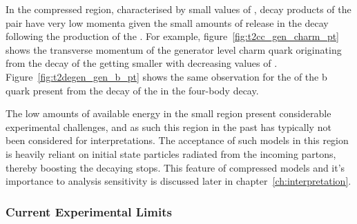 In the compressed region, characterised by small values of \deltam, decay
products of the \sTop pair have very low momenta given the small amounts of
release in the decay following the production of the \chiz. For example, 
figure~\ref{fig:t2cc_gen_charm_pt} shows the transverse momentum of the
generator level charm quark originating from the decay of the \sTop getting
smaller
with decreasing values of \deltam. Figure~\ref{fig:t2degen_gen_b_pt} shows the
same observation for the \Pt of the b quark present from the decay of the
\sTop in the four-body decay.

The low amounts of available energy in the small \deltam region present considerable
experimental challenges, and as such this region in the past has typically not
been considered for interpretations. The acceptance of such models in this
region is heavily reliant on initial state particles radiated from the
incoming partons, thereby boosting the decaying stops. This feature of
compressed models and it's importance to analysis sensitivity is discussed
later in chapter~\ref{ch:interpretation}.

\subsubsection{Current Experimental Limits}

